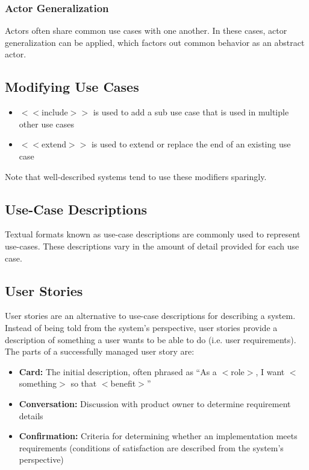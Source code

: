 \documentclass[12pt,titlepage]{article}
\begin{document}
        \subsubsection{Actor Generalization}
          Actors often share common use cases with one another. In these cases, actor generalization can be applied, which factors out common behavior as an
          abstract actor.

      \subsection{Modifying Use Cases}
        \begin{itemize}
          \item $<<$include$>>$ is used to add a sub use case that is used in multiple other use cases
          \item $<<$extend$>>$ is used to extend or replace the end of an existing use case
        \end{itemize}
        Note that well-described systems tend to use these modifiers sparingly.

      \subsection{Use-Case Descriptions}
        Textual formats known as use-case descriptions are commonly used to represent use-cases. These descriptions vary in the amount of detail provided for
        each use case.

      \subsection{User Stories}
        User stories are an alternative to use-case descriptions for describing a system. Instead of being told from the system's perspective, user stories
        provide a description of something a user wants to be able to do (i.e. user requirements). The parts of a successfully managed user story are:
        \begin{itemize}
          \item \textbf{Card:} The initial description, often phrased as ``As a $<$role$>$, I want $<$something$>$ so that $<$benefit$>$''
          \item \textbf{Conversation:} Discussion with product owner to determine requirement details
          \item \textbf{Confirmation:} Criteria for determining whether an implementation meets requirements (conditions of satisfaction are described
          from the system's perspective)
        \end{itemize}
\end{document}
